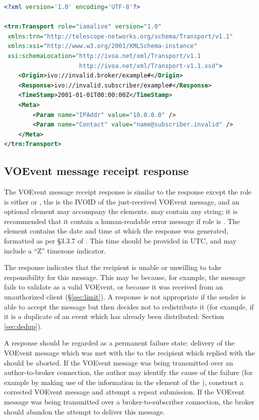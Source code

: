 \documentclass[a4paper,11pt]{ivoa}
\begin{document}
\begin{lstlisting}[language=XML,caption=Sample \xmlel{iamalive} response.,
                   label=lst:iamaliveresponse]
<?xml version='1.0' encoding='UTF-8'?>

<trn:Transport role="iamalive" version="1.0"
 xmlns:trn="http://telescope-networks.org/schema/Transport/v1.1"
 xmlns:xsi="http://www.w3.org/2001/XMLSchema-instance"
 xsi:schemaLocation="http://ivoa.net/xml/Transport/v1.1
                     http://ivoa.net/xml/Transport-v1.1.xsd">
    <Origin>ivo://invalid.broker/example#</Origin>
    <Response>ivo://invalid.subscriber/example#</Response>
    <TimeStamp>2001-01-01T00:00:00Z</TimeStamp>
    <Meta>
        <Param name="IPAddr" value="10.0.0.0" />
        <Param name="Contact" value="name@subscriber.invalid" />
    </Meta>
</trn:Transport>
\end{lstlisting}

\subsection{VOEvent message receipt response}
\label{sec:transport:ack}

The VOEvent message receipt response is similar to the 
response except the role is either  or , the
 is the IVOID of the just-received VOEvent message, and an
optional  element may accompany the 
elements.  may contain any string; it is recommended that it
contain a human-readable error message if role is . The
 element contains the date and time at which the response
was generated, formatted as per \S3.3.7 of \citet{Peterson:2012}. This time
should be provided in UTC, and may include a “Z” timezone indicator.

The  response indicates that the recipient is unable or unwilling
to take responsibility for this message. This may be because, for example, the
message fails to validate as a valid VOEvent, or because it was received from
an unauthorized client (\S\ref{sec:limit}). A  response is not
appropriate if the sender is able to accept the message but then decides not
to redistribute it (for example, if it is a duplicate of an event which has
already been distributed: Section \ref{sec:dedup}).

A  response should be regarded as a permanent failure state:
delivery of the VOEvent message which was met with the  to the
recipient which replied with the  should be aborted. If the
VOEvent message was being transmitted over an author-to-broker connection,
the author may identify the cause of the failure (for example by making use of
the information in the  element of the ),
construct a corrected VOEvent message and attempt a repeat submission. If the
VOEvent message was being transmitted over a broker-to-subscriber connection,
the broker should abandon the attempt to deliver this message.
\end{document}

